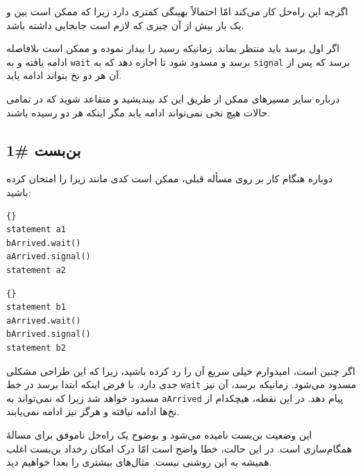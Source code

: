 \documentclass{book}
\begin{document}
    اگرچه این راه‌حل کار می‌کند امّا احتمالاً  بهینگی کمتری دارد زیرا که ممکن است بین   و  یک بار بیش از آن چیزی که لازم است 
    جابجایی داشته باشد. 

    اگر اول     برسد باید منتظر    بماند. زمانیکه     رسید      را بیدار نموده و ممکن است بلافاصله 
    ادامه یافته و به   \texttt{wait} برسد و مسدود شود تا اجازه دهد که      به  \texttt{signal} برسد که پس از آن 
    هر دو نخ بتواند ادامه یابد. 

    درباره سایر مسیرهای ممکن از طریق این کد بیندیشید و متقاعد شوید که در تمامی حالات هیچ نخی نمی‌تواند ادامه یابد مگر اینکه هر دو رسیده باشند. 

\subsection {بن‌بست \#1}

      دوباره هنگام کار بر روی مسأله قبلی، ممکن است کدی مانند زیرا را امتحان کرده باشید:

\begin{latin}
\begin{minipage}[t]{2in}
\begin{latin}
\begin{lstlisting}[title=\rl{نخ \lr{A}}]{}
statement a1
bArrived.wait()
aArrived.signal()
statement a2
\end{lstlisting}
\end{latin}
\end{minipage}
\hfill
\begin{minipage}[t]{2in}
\begin{latin}
\begin{lstlisting}[title=\rl{نخ \lr{B}}]{}
statement b1
aArrived.wait()
bArrived.signal()
statement b2
\end{lstlisting}
\end{latin}
\end{minipage}
\end{latin}

    اگر چنین است، امیدوارم خیلی سریع آن را رد کرده باشید، زیرا که این طراحی مشکلی جدی دارد. با فرض اینکه ابتدا  برسد 
    در خط \texttt{wait} مسدود می‌شود. زمانیکه   برسد، آن نیز مسدود خواهد شد زیرا که  نمی‌تواند به \texttt{aArrived}
    پیام دهد. در این نقطه، هیچکدام از نخ‌ها ادامه نیافته و هرگز نیز ادامه نمی‌یابند. 

    این وضعیت بن‌بست نامیده می‌شود و بوضوح یک راه‌حل ناموفق برای مسالهٔ همگام‌سازی است. 
    در این حالت، خطا واضح است امّا درک امکان رخداد بن‌بست اغلب همیشه به این روشنی نیست. 
    مثال‌های بیشتری را بعدا خواهیم دید. 
\end{document}
